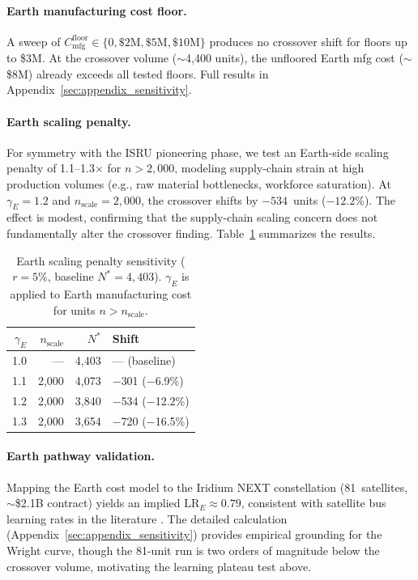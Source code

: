 \documentclass[preprint,12pt]{elsarticle}
\begin{document}
\paragraph{Earth manufacturing cost floor.} A sweep of $C_{\mathrm{mfg}}^{\mathrm{floor}} \in \{0, \$2\text{M}, \$5\text{M}, \$10\text{M}\}$ produces no crossover shift for floors up to \$3M. At the crossover volume ($\sim$4{,}400 units), the unfloored Earth mfg cost ($\sim$\$8M) already exceeds all tested floors. Full results in Appendix~\ref{sec:appendix_sensitivity}.

\paragraph{Earth scaling penalty.} For symmetry with the ISRU pioneering phase, we test an Earth-side scaling penalty of 1.1--1.3$\times$ for $n > 2{,}000$, modeling supply-chain strain at high production volumes (e.g., raw material bottlenecks, workforce saturation). At $\gamma_E = 1.2$ and $n_{\mathrm{scale}} = 2{,}000$, the crossover shifts by $-534$~units ($-12.2\%$). The effect is modest, confirming that the supply-chain scaling concern does not fundamentally alter the crossover finding. Table~\ref{tab:earth_scale} summarizes the results.

\begin{table}[htbp]
\centering
\caption{Earth scaling penalty sensitivity ($r = 5\%$, baseline $N^* = 4{,}403$). $\gamma_E$ is applied to Earth manufacturing cost for units $n > n_{\mathrm{scale}}$.}
\label{tab:earth_scale}
\small
\begin{tabular}{@{}rrrl@{}}
\toprule
$\gamma_E$ & $n_{\mathrm{scale}}$ & $N^*$ & Shift \\
\midrule
1.0 & --- & 4{,}403 & --- (baseline) \\
1.1 & 2{,}000 & 4{,}073 & $-$301 ($-$6.9\%) \\
1.2 & 2{,}000 & 3{,}840 & $-$534 ($-$12.2\%) \\
1.3 & 2{,}000 & 3{,}654 & $-$720 ($-$16.5\%) \\
\bottomrule
\end{tabular}
\end{table}

\paragraph{Earth pathway validation.} Mapping the Earth cost model to the Iridium NEXT constellation (81~satellites, $\sim$\$2.1B contract) yields an implied $\mathrm{LR}_E \approx 0.79$, consistent with satellite bus learning rates in the literature \cite{wertz2011}. The detailed calculation (Appendix~\ref{sec:appendix_sensitivity}) provides empirical grounding for the Wright curve, though the 81-unit run is two orders of magnitude below the crossover volume, motivating the learning plateau test above.
\end{document}
